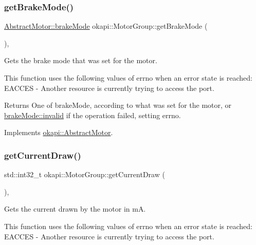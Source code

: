 \subsubsection{\texorpdfstring{getBrakeMode()}{getBrakeMode()}}
{\footnotesize\ttfamily \mbox{\hyperlink{classokapi_1_1AbstractMotor_a132e0485dbb59a60c3f934338d8fa601}{Abstract\+Motor\+::brake\+Mode}} okapi\+::\+Motor\+Group\+::get\+Brake\+Mode (\begin{DoxyParamCaption}{ }\end{DoxyParamCaption})\hspace{0.3cm}{\ttfamily [override]}, {\ttfamily [virtual]}}

Gets the brake mode that was set for the motor.

This function uses the following values of errno when an error state is reached\+: E\+A\+C\+C\+ES -\/ Another resource is currently trying to access the port.

\begin{DoxyReturn}{Returns}
One of brake\+Mode, according to what was set for the motor, or \mbox{\hyperlink{classokapi_1_1AbstractMotor_a132e0485dbb59a60c3f934338d8fa601afedb2d84cafe20862cb4399751a8a7e3}{brake\+Mode\+::invalid}} if the operation failed, setting errno. 
\end{DoxyReturn}


Implements \mbox{\hyperlink{classokapi_1_1AbstractMotor_a157407c39c952a7c2eb497bddb868c93}{okapi\+::\+Abstract\+Motor}}.

\mbox{\label{classokapi_1_1MotorGroup_a5cdc06b92c943b2348130b162f6c5f16}} 
\subsubsection{\texorpdfstring{getCurrentDraw()}{getCurrentDraw()}}
{\footnotesize\ttfamily std\+::int32\+\_\+t okapi\+::\+Motor\+Group\+::get\+Current\+Draw (\begin{DoxyParamCaption}{ }\end{DoxyParamCaption})\hspace{0.3cm}{\ttfamily [override]}, {\ttfamily [virtual]}}

Gets the current drawn by the motor in mA.

This function uses the following values of errno when an error state is reached\+: E\+A\+C\+C\+ES -\/ Another resource is currently trying to access the port.

